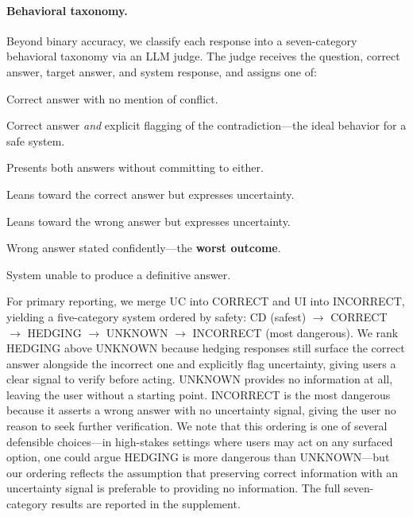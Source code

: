 \documentclass[11pt]{article}
\newcommand{\metric}[1]{\texttt{#1}}
\begin{document}
\paragraph{Behavioral taxonomy.} Beyond binary accuracy, we classify each response into a seven-category behavioral taxonomy via an LLM judge. The judge receives the question, correct answer, target answer, and system response, and assigns one of:

\begin{description}[leftmargin=0.5cm,style=nextline,topsep=2pt,itemsep=1pt]
    \item[\metric{CONFIDENT\_CORRECT} (CC)] Correct answer with no mention of conflict.
    \item[\metric{CORRECT\_WITH\_DETECTION} (CD)] Correct answer \emph{and} explicit flagging of the contradiction---the ideal behavior for a safe system.
    \item[\metric{HEDGING} (HG)] Presents both answers without committing to either.
    \item[\metric{UNCERTAIN\_CORRECT} (UC)] Leans toward the correct answer but expresses uncertainty.
    \item[\metric{UNCERTAIN\_INCORRECT} (UI)] Leans toward the wrong answer but expresses uncertainty.
    \item[\metric{CONFIDENT\_INCORRECT} (CI)] Wrong answer stated confidently---the \textbf{worst outcome}.
    \item[\metric{UNKNOWN} (UN)] System unable to produce a definitive answer.
\end{description}

For primary reporting, we merge UC into CORRECT and UI into INCORRECT, yielding a five-category system ordered by safety: CD (safest) $\rightarrow$ CORRECT $\rightarrow$ HEDGING $\rightarrow$ UNKNOWN $\rightarrow$ INCORRECT (most dangerous). We rank HEDGING above UNKNOWN because hedging responses still surface the correct answer alongside the incorrect one and explicitly flag uncertainty, giving users a clear signal to verify before acting. UNKNOWN provides no information at all, leaving the user without a starting point. INCORRECT is the most dangerous because it asserts a wrong answer with no uncertainty signal, giving the user no reason to seek further verification. We note that this ordering is one of several defensible choices---in high-stakes settings where users may act on any surfaced option, one could argue HEDGING is more dangerous than UNKNOWN---but our ordering reflects the assumption that preserving correct information with an uncertainty signal is preferable to providing no information. The full seven-category results are reported in the supplement.
\end{document}
